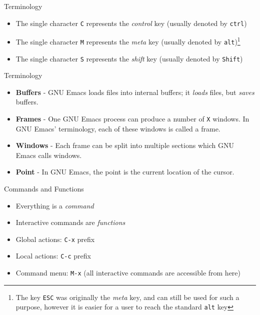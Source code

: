 \documentclass[12pt,a4paper,oneside]{beamer}
\begin{document}
\begin{frame}{Terminology}
\begin{itemize}
  \item The single character \texttt{C} represents the \emph{control} key (usually denoted by \texttt{ctrl})\newline
  \item The single character \texttt{M} represents the \emph{meta} key (usually denoted by \texttt{alt})\footnote{The key \texttt{ESC} was originally the \emph{meta} key, and can still be used for such a purpose, however it is easier for a user to reach the standard \texttt{alt} key}\newline
  \item The single character \texttt{S} represents the \emph{shift} key (usually denoted by \texttt{Shift})
\end{itemize}
\end{frame}

\begin{frame}{Terminology}
\begin{itemize}
  \item \textbf{Buffers} - GNU Emacs loads files into internal buffers; it \emph{loads} files, but \emph{saves} buffers.\newline
  \item \textbf{Frames} - One GNU Emacs process can produce a number of \texttt{X} windows. In GNU Emacs' terminology, each of these windows is called a frame.\newline
  \item \textbf{Windows} - Each frame can be split into multiple sections which GNU Emacs calls windows.\newline
  \item \textbf{Point} - In GNU Emacs, the point is the current location of the cursor.
\end{itemize}
\end{frame}

\begin{frame}{Commands and Functions}
\begin{itemize}
  \item Everything is a \emph{command}\newline
  \item Interactive commands are \emph{functions}\newline
  \item Global actions: \texttt{C-x} prefix\newline
  \item Local actions: \texttt{C-c} prefix\newline
  \item Command menu: \texttt{M-x} (all interactive commands are accessible from here)
\end{itemize}
\end{frame}
\end{document}
